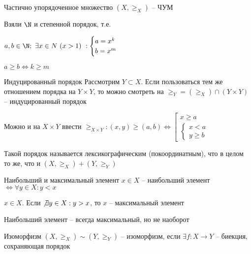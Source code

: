 \documentclass[12pt]{article}
\begin{document}
\begin{defin}{Частично упорядоченное множество}
    $(X, \geq_X)$ -- ЧУМ
\end{defin}

\begin{Example}{}
    Взяли $\N$ и степенной порядок, т.е.

    $a, b \in \N;\ \exists x \in N\ (x > 1)\ : \begin{cases}
        a = x^k \\
        b = x^m
    \end{cases}$

    $a \geq b \Leftrightarrow k \geq m$
\end{Example}

\begin{defin}{Индуцированный порядок}
    Рассмотрим $Y \subset X$. Если пользоваться тем же отношением порядка на $Y \times Y$, то можно смотреть на $\geq_Y = (\geq_X) \cap (Y \times Y)$ -- индуцированный порядок
\end{defin}

\begin{Remark}{}
    Можно и на $X \times Y$ ввести $\geq_{X \times Y} : (x, y) \geq (a, b) \Leftrightarrow \left[ \begin{gathered}
        x \geq a \\
        \begin{cases}
            x < a \\
            y \geq b
        \end{cases}
    \end{gathered} \right.$

    Такой порядок называется лексикографическим (покоординатным), что в целом то же, что и $(X, \geq_X) + (Y, \geq_Y)$
\end{Remark}

\begin{defin}{Наибольший и максимальный элемент}
    $x \in X$ -- наибольший элемент $\Leftrightarrow \forall y \in X : y < x$

    $x \in X$. Если $\not\exists y \in X : y > x$, то $x$ -- максимальный элемент

    \begin{Remark}{}
        Наибольший элемент -- всегда максимальный, но не наоборот
    \end{Remark}
\end{defin}

\begin{defin}{Изоморфизм}
    $(X, \geq_X) \sim (Y, \geq_Y)$ -- изоморфизм, если $\exists f : X \rightarrow Y$ -- биекция, сохраняющая порядок
\end{defin}
\end{document}
